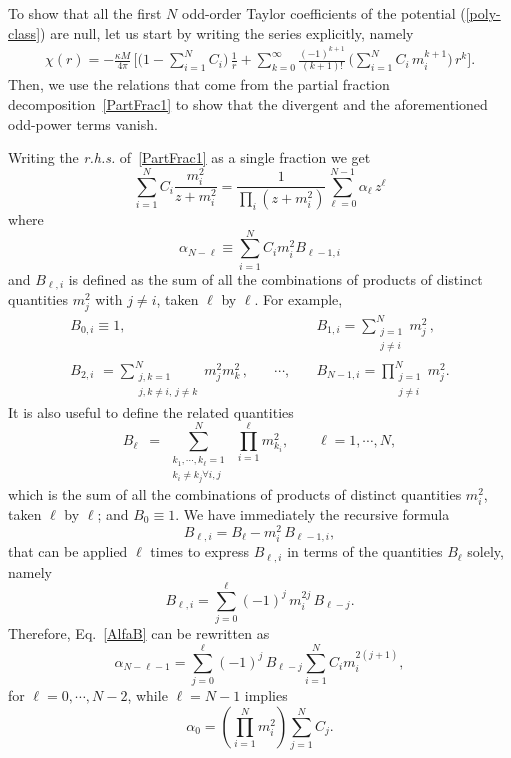 \documentclass[aps,prd,a4paper,twocolumn,showpacs,showkeys,preprintnumbers,amsmath,amssymb,nofootinbib]{revtex4-2}
\numberwithin{equation}{section}
\def\beq{\begin{equation}}
\def\eeq{\end{equation}}
\newcommand{\eq}[1]{(\ref{#1})}
\def\al{\alpha}
\def\ka{\kappa}
\begin{document}
To show that all the first $N$ odd-order Taylor coefficients of the potential \eq{poly-class} are null, let us start by writing the series explicitly, namely
%
\begin{equation} \label{Taylor-Pot}
\begin{split}
\chi (r) =  - \frac{\ka M}{ 4 \pi} \, \Bigg[  \Bigg( 1 - \sum_{i=1}^N C_i \Bigg)  \, \frac{1}{r} 
+ \sum_{k=0}^\infty \frac{(-1)^{k+1}}{(k+1)!} \, \Bigg( \sum_{i=1}^N C_i \, m_i^{k+1} \Bigg) \, r^k \Bigg] .
\end{split}
\end{equation}
%
Then, we use the relations that come from the partial fraction decomposition~\eqref{PartFrac1} to show that the  divergent and the aforementioned odd-power terms vanish.

Writing the \textit{r.h.s.} of~\eqref{PartFrac1} as a single fraction we get
%
\beq \label{PartFrac2}
\sum_{i=1}^N C_i \frac{ m_i^2}{z + m_i^2} = \frac{1}{\prod_i ( z + m_i^2)} \sum_{\ell =0}^{N-1} \al_{\ell} \, z^\ell
\eeq
where
\beq \label{AlfaB}
\al_{N-\ell} \equiv \sum_{i=1}^N C_i m_i^2 B_{\ell-1,i} 
\eeq
and $B_{\ell,i}$ is defined as the sum of all the combinations of products of distinct quantities $m_j^2$ with $j \neq i$, taken $\ell$ by $\ell$. For example,
%
\begin{eqnarray*}
B_{0,i}  \equiv  1 ,
&  &
B_{1,i}  =  \sum_{\substack{j=1\\j \neq i}}^N m_j^2 \, ,
\\
B_{2,i} \,\, =  \sum_{\substack{j,k=1\\j,k\neq i,\,j\neq k}}^N m_j^2 m_k^2 \, ,
& \quad \cdots  , \quad &
B_{N-1,i}  =  \prod_{\substack{j=1\\j\neq i}}^N m_j^2 .
\end{eqnarray*}
%
It is also useful to define the related quantities 
\beq
B_\ell \,\,\, = \, \sum_{\substack{k_1,\cdots,k_\ell=1 \\ k_i\neq k_j \forall i,j}}^N \,\, \prod_{i=1}^\ell m_{k_i}^2 , \qquad \ell=1,\cdots,N,
\eeq
which is the sum of all the combinations of products of distinct quantities $m_i^2$, taken $\ell$ by $\ell$; and $B_0 \equiv 1$. We have immediately the recursive formula
%
\beq
B_{\ell,i} = B_\ell - m_i^2 \, B_{\ell-1,i},
\eeq
that can be applied $\ell$ times to express $B_{\ell,i}$ in terms of the quantities $B_\ell$ solely, namely
%
\beq
B_{\ell,i} = \sum_{j=0}^\ell (-1)^j \, m_i^{2j} \, B_{\ell-j}.
\eeq
%
Therefore, Eq.~\eqref{AlfaB} can be rewritten as
\beq \label{alfa-final}
\al_{N-\ell-1} = \sum_{j=0}^{\ell} (-1)^j \, B_{\ell-j} \sum_{i=1}^N C_i m_i^{2(j+1)} ,
\eeq
%
for $\ell=0,\cdots,N-2$, while $\ell=N-1$ implies
\beq 
\alpha_0 = \left( \prod_{i=1}^N m_i^2 \right)  \sum_{j=1}^N C_j. 
\eeq
\end{document}
